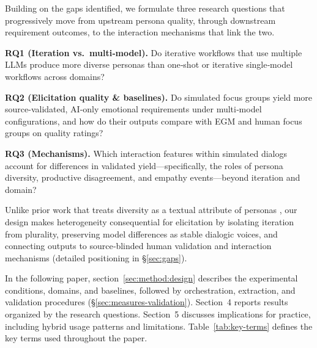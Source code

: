 \documentclass[acmsmall]{acmart}
\begin{document}
Building on the gaps identified, we formulate three research questions that progressively move from upstream persona quality, through downstream requirement outcomes, to the interaction mechanisms that link the two.

\smallskip\noindent\textbf{RQ1 (Iteration vs.\ multi‑model).} Do iterative workflows that use multiple LLMs produce more diverse personas than one‑shot or iterative single‑model workflows across domains?

\smallskip\noindent\textbf{RQ2 (Elicitation quality \& baselines).} Do simulated focus groups yield more source-validated, AI‑only emotional requirements under multi‑model configurations, and how do their outputs compare with EGM and human focus groups on quality ratings?

\smallskip\noindent\textbf{RQ3 (Mechanisms).} Which interaction features within simulated dialogs account for differences in validated yield---specifically, the roles of persona diversity, productive disagreement, and empathy events---beyond iteration and domain?

Unlike prior work that treats diversity as a textual attribute of personas \cite{lazik2025good}, our design makes heterogeneity consequential for elicitation by isolating iteration from plurality, preserving model differences as stable dialogic voices, and connecting outputs to source‑blinded human validation and interaction mechanisms (detailed positioning in \S\ref{sec:gaps}). 

In the following paper, section~\ref{sec:method:design} describes the experimental conditions, domains, and baselines, followed by orchestration, extraction, and validation procedures (\S\ref{sec:measures-validation}). Section~4 reports results organized by the research questions. Section~5 discusses implications for practice, including hybrid usage patterns and limitations. Table~\ref{tab:key-terms} defines the key terms used throughout the paper.
\end{document}
